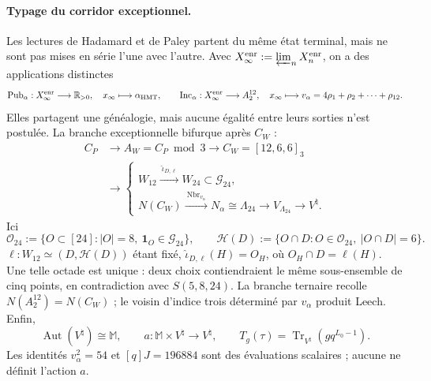 \paragraph{Typage du corridor exceptionnel.}
Les lectures de Hadamard et de Paley partent du même état terminal, mais ne sont pas
mises en série l'une avec l'autre. Avec
\(X_\infty^{\rm enr}:=\varprojlim_nX_n^{\rm enr}\), on a des applications distinctes
\begin{equation}
 \operatorname{Pub}_\alpha:X_\infty^{\rm enr}\longrightarrow\mathbb R_{>0},
 \quad x_\infty\longmapsto\alpha_{\rm HMT},
 \qquad
 \operatorname{Inc}_\alpha:X_\infty^{\rm enr}\longrightarrow A_2^{12},
 \quad x_\infty\longmapsto
 v_\alpha=4\rho_1+\rho_2+\cdots+\rho_{12}.
 \label{eq:frontal-dos-publicaciones-alpha}
\end{equation}
Elles partagent une généalogie, mais aucune égalité entre leurs sorties n'est postulée. La branche
exceptionnelle bifurque après \(C_W\) :
\begin{equation}
 \begin{aligned}
 C_P&\longrightarrow A_W=C_P\bmod3\longrightarrow
 C_W=[12,6,6]_3\\
 &\longrightarrow
 \begin{cases}
 W_{12}\xrightarrow{\ \widehat\iota_{D,\ell}\ }
 W_{24}\subset\mathcal G_{24},\\[2pt]
 N(C_W)\xrightarrow{\ \operatorname{Nbr}_{v_\alpha}\ }
 N_\alpha\cong\Lambda_{24}\longrightarrow
 V_{\Lambda_{24}}\longrightarrow V^\natural .
 \end{cases}
 \end{aligned}
 \label{eq:frontal-cadena-excepcional}
\end{equation}
Ici
\begin{equation}
 \mathcal O_{24}:=\{O\subset[24]:|O|=8,\ \mathbf1_O\in\mathcal G_{24}\},
 \qquad
 \mathcal H(D):=\{O\cap D:O\in\mathcal O_{24},\ |O\cap D|=6\}.
 \label{eq:frontal-octadas-hexadas-dodecada}
\end{equation}
\(\ell:W_{12}\simeq(D,\mathcal H(D))\) étant fixé,
\(\widehat\iota_{D,\ell}(H)=O_H\), où
\(O_H\cap D=\ell(H)\). Une telle octade est unique : deux choix contiendraient le
même sous-ensemble de cinq points, en contradiction avec \(S(5,8,24)\). La branche
ternaire recolle \(N(A_2^{12})=N(C_W)\) ; le voisin d'indice trois déterminé
par \(v_\alpha\) produit Leech. Enfin,
\begin{equation}
 \operatorname{Aut}(V^\natural)\cong\mathbb M,\qquad
 a:\mathbb M\times V^\natural\longrightarrow V^\natural,\qquad
 T_g(\tau)=\operatorname{Tr}_{V^\natural}(gq^{L_0-1}).
 \label{eq:frontal-accion-monstruo}
\end{equation}
Les identités \(v_\alpha^2=54\) et \([q]J=196884\) sont des évaluations
scalaires ; aucune ne définit l'action \(a\).

